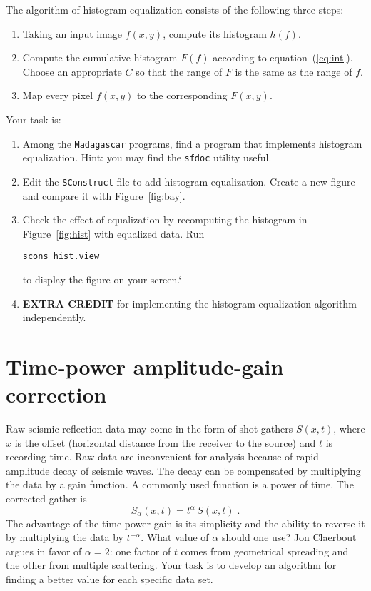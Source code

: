 The algorithm of histogram equalization consists of the following three steps:
\begin{enumerate}
\item Taking an input image $f(x,y)$, compute its histogram $h(f)$.
\item Compute the cumulative histogram $F(f)$ according to equation~(\ref{eq:int}). Choose an appropriate $C$ so that the range of $F$ is the same as the range of $f$.
\item Map every pixel $f(x,y)$ to the corresponding $F(x,y)$.
\end{enumerate}

Your task is:
\begin{enumerate}
\item Among the \texttt{Madagascar} programs, find a program that implements histogram equalization. Hint: you may find the \texttt{sfdoc} utility useful.
\item Edit the \texttt{SConstruct} file to add histogram equalization. Create a new figure and compare it with Figure~\ref{fig:bay}. 
\item Check the effect of equalization by recomputing the histogram in Figure~\ref{fig:hist} with equalized data. Run
\begin{verbatim}
scons hist.view
\end{verbatim}
to display the figure on your screen.`
\item \textbf{EXTRA CREDIT} for implementing the histogram equalization algorithm independently.
\end{enumerate}	

\lstset{language=python,numbers=left,numberstyle=\tiny,showstringspaces=false}


\section{Time-power amplitude-gain correction}

Raw seismic reflection data may come in the form of shot gathers
$S(x,t)$, where $x$ is the offset (horizontal distance from the
receiver to the source) and $t$ is recording time. Raw data are
inconvenient for analysis because of rapid amplitude decay of seismic
waves. The decay can be compensated by multiplying the data by a gain
function. A commonly used function is a power of time. The corrected
gather is
\begin{equation}
\label{eq:tpow}
S_\alpha(x,t) = t^{\alpha}\,S(x,t)\;.
\end{equation}
The advantage of the time-power gain is its simplicity and the ability
to reverse it by multiplying the data by $t^{-\alpha}$. What value of
$\alpha$ should one use? Jon Claerbout argues in favor of $\alpha=2$:
one factor of $t$ comes from geometrical spreading and the other from
multiple scattering. Your task is to develop an algorithm for finding
a better value for each specific data set.

